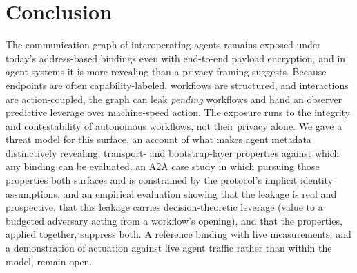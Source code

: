 \documentclass[10pt,twocolumn]{article}
\theoremstyle{definition}
\begin{document}
\section{Conclusion}\label{sec:conclusion}
The communication graph of interoperating agents remains exposed under today's
address-based bindings even with end-to-end payload encryption, and in agent
systems it is more revealing than a privacy framing suggests. Because endpoints are often
capability-labeled, workflows are structured, and interactions are action-coupled,
the graph can leak \emph{pending} workflows and hand an observer predictive leverage
over machine-speed action. The exposure runs to the integrity and contestability of
autonomous workflows, not their privacy alone. We gave a threat model for this
surface, an account of what makes agent metadata distinctively revealing, transport-
and bootstrap-layer properties against which any binding can be evaluated, an A2A
case study in which pursuing those properties both surfaces and is constrained by the
protocol's implicit identity assumptions, and an empirical evaluation showing that
the leakage is real and prospective, that this leakage carries decision-theoretic
leverage (value to a budgeted adversary acting from a workflow's opening), and
that the properties, applied together, suppress both. A reference binding with live
measurements, and a demonstration of actuation against live agent traffic rather than
within the model, remain open.



\end{document}
